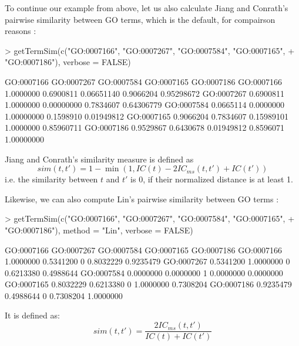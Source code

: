 \documentclass[12pt,a4paper]{article}
\begin{document}
To continue our example from above, let us also calculate Jiang and Conrath's pairwise similarity between GO terms, which is the default, for compairson reasons \cite{Jiang98}:
\begin{Schunk}
\begin{Sinput}
> getTermSim(c("GO:0007166", "GO:0007267", "GO:0007584", "GO:0007165", 
+     "GO:0007186"), verbose = FALSE)
\end{Sinput}
\begin{Soutput}
           GO:0007166 GO:0007267 GO:0007584 GO:0007165 GO:0007186
GO:0007166  1.0000000  0.6900811 0.06651140  0.9066204 0.95298672
GO:0007267  0.6900811  1.0000000 0.00000000  0.7834607 0.64306779
GO:0007584  0.0665114  0.0000000 1.00000000  0.1598910 0.01949812
GO:0007165  0.9066204  0.7834607 0.15989101  1.0000000 0.85960711
GO:0007186  0.9529867  0.6430678 0.01949812  0.8596071 1.00000000
\end{Soutput}
\end{Schunk}
Jiang and Conrath's similarity measure is defined as
\begin{equation}
sim(t,t') = 1 - \min(1, IC(t) - 2IC_{ms}(t,t') + IC(t'))
\end{equation}
i.e. the similarity between $t$ and $t'$ is 0, if their normalized distance is at least 1.

Likewise, we can also compute Lin's pairwise similarity between GO terms \cite{Lin98}:
\begin{Schunk}
\begin{Sinput}
> getTermSim(c("GO:0007166", "GO:0007267", "GO:0007584", "GO:0007165", 
+     "GO:0007186"), method = "Lin", verbose = FALSE)
\end{Sinput}
\begin{Soutput}
           GO:0007166 GO:0007267 GO:0007584 GO:0007165 GO:0007186
GO:0007166  1.0000000  0.5341200          0  0.8032229  0.9235479
GO:0007267  0.5341200  1.0000000          0  0.6213380  0.4988644
GO:0007584  0.0000000  0.0000000          1  0.0000000  0.0000000
GO:0007165  0.8032229  0.6213380          0  1.0000000  0.7308204
GO:0007186  0.9235479  0.4988644          0  0.7308204  1.0000000
\end{Soutput}
\end{Schunk}
It is defined as:
\begin{equation}
sim(t,t') = \frac{2IC_{ms}(t,t')}{IC(t) + IC(t')}\label{eq:Lin}
\end{equation}
\end{document}
